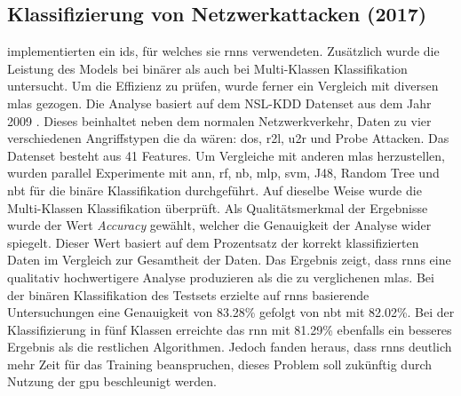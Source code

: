 \documentclass[
    12pt, %
    DIV10,
    ngerman, %
    a4paper, %
    oneside, %
    titlepage, %
    parskip=half, %
    headings=normal, %
    listof=totoc, %
    bibliography=totoc, %
    index=totoc, %
    captions=tableheading, %
    final %
]{scrreprt}
\begin{document}
\subsection{Klassifizierung von Netzwerkattacken (2017)}\label{yin}
\textcite{Yin2017} implementierten ein \ac{ids}, für welches sie \ac{rnns} verwendeten. Zusätzlich wurde die Leistung des Models bei binärer als auch bei Multi-Klassen Klassifikation untersucht. Um die Effizienz zu prüfen, wurde ferner ein Vergleich mit diversen \ac{mlas} gezogen. Die Analyse basiert auf dem NSL-KDD Datenset aus dem Jahr 2009 \parencite{Cybersecurity}. Dieses beinhaltet neben dem normalen Netzwerkverkehr, Daten zu vier verschiedenen Angriffstypen die da wären: \ac{dos}, \ac{r2l}, \ac{u2r} und Probe Attacken. Das Datenset besteht aus 41 Features. Um Vergleiche mit anderen \ac{mlas} herzustellen, wurden parallel Experimente mit \ac{ann}, \ac{rf}, \ac{nb}, \ac{mlp}, \ac{svm}, J48, Random Tree und \ac{nbt} für die binäre Klassifikation durchgeführt. Auf dieselbe Weise wurde die Multi-Klassen Klassifikation überprüft. Als Qualitätsmerkmal der Ergebnisse wurde der Wert \emph{Accuracy} gewählt, welcher die Genauigkeit der Analyse wider spiegelt. Dieser Wert basiert auf dem Prozentsatz der korrekt klassifizierten Daten im Vergleich zur Gesamtheit der Daten. Das Ergebnis zeigt, dass \ac{rnns} eine qualitativ hochwertigere Analyse produzieren als die zu verglichenen \ac{mlas}. Bei der binären Klassifikation des Testsets erzielte auf \ac{rnns} basierende Untersuchungen eine Genauigkeit von 83.28\% gefolgt von \ac{nbt} mit 82.02\%. Bei der Klassifizierung in fünf Klassen erreichte das \ac{rnn} mit 81.29\% ebenfalls ein besseres Ergebnis als die restlichen Algorithmen. Jedoch fanden \textcite{Yin2017} heraus, dass \ac{rnns} deutlich mehr Zeit für das Training beanspruchen, dieses Problem soll zukünftig durch Nutzung der \ac{gpu} beschleunigt werden.
%
\end{document}
